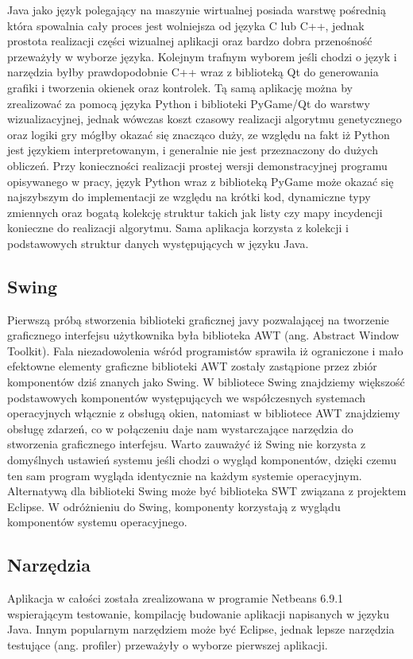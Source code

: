 \begin{par}
	Java jako język polegający na maszynie wirtualnej posiada warstwę pośrednią która spowalnia cały proces jest wolniejsza od języka C lub C++, jednak prostota realizacji części wizualnej aplikacji oraz bardzo dobra przenośność przeważyły w wyborze języka.
	Kolejnym trafnym wyborem jeśli chodzi o język i narzędzia byłby prawdopodobnie C++ wraz z biblioteką Qt do generowania grafiki i tworzenia okienek oraz kontrolek.
	Tą samą aplikację można by zrealizować za pomocą języka Python i biblioteki PyGame/Qt do warstwy wizualizacyjnej, jednak wówczas koszt czasowy realizacji algorytmu genetycznego oraz logiki gry mógłby okazać się znacząco duży, ze względu na fakt iż Python jest językiem interpretowanym, i generalnie nie jest przeznaczony do dużych obliczeń.
	Przy konieczności realizacji prostej wersji demonstracyjnej programu opisywanego w pracy, język Python wraz z biblioteką PyGame może okazać się najszybszym do implementacji ze względu na krótki kod, dynamiczne typy zmiennych oraz bogatą kolekcję struktur takich jak listy czy mapy incydencji konieczne do realizacji algorytmu.
	Sama aplikacja korzysta z kolekcji i podstawowych struktur danych występujących w języku Java.
	\subsection{Swing}
	Pierwszą próbą stworzenia biblioteki graficznej javy pozwalającej na tworzenie graficznego interfejsu użytkownika była biblioteka AWT (ang. Abstract Window Toolkit).
	Fala niezadowolenia wśród programistów sprawiła iż ograniczone i mało efektowne elementy graficzne biblioteki AWT zostały zastąpione przez zbiór komponentów dziś znanych jako Swing.
	W bibliotece Swing znajdziemy większość podstawowych komponentów występujących we współczesnych systemach operacyjnych włącznie z obsługą okien, natomiast w bibliotece AWT znajdziemy obsługę zdarzeń, co w połączeniu daje nam wystarczające narzędzia do stworzenia graficznego interfejsu.
	Warto zauważyć iż Swing nie korzysta z domyślnych ustawień systemu jeśli chodzi o wygląd komponentów, dzięki czemu ten sam program wygląda identycznie na każdym systemie operacyjnym.
	Alternatywą dla biblioteki Swing może być biblioteka SWT związana z projektem Eclipse.
	W odróżnieniu do Swing, komponenty korzystają z wyglądu komponentów systemu operacyjnego.
	\subsection{Narzędzia}
	Aplikacja w całości została zrealizowana w programie Netbeans 6.9.1 wspierającym testowanie, kompilację budowanie aplikacji napisanych w języku Java.
	Innym popularnym narzędziem może być Eclipse, jednak lepsze narzędzia testujące (ang. profiler) przeważyły o wyborze pierwszej aplikacji.
\end{par}

